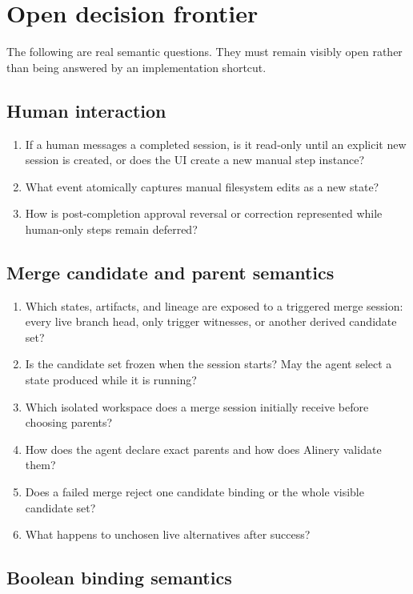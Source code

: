 \documentclass[11pt]{article}
\begin{document}
\section{Open decision frontier}

The following are real semantic questions. They must remain visibly open rather than being answered by an implementation shortcut.

\subsection{Human interaction}

\begin{enumerate}
  \item If a human messages a completed session, is it read-only until an explicit new session is created, or does the UI create a new manual step instance?
  \item What event atomically captures manual filesystem edits as a new state?
  \item How is post-completion approval reversal or correction represented while human-only steps remain deferred?
\end{enumerate}

\subsection{Merge candidate and parent semantics}

\begin{enumerate}
  \item Which states, artifacts, and lineage are exposed to a triggered merge session: every live branch head, only trigger witnesses, or another derived candidate set?
  \item Is the candidate set frozen when the session starts? May the agent select a state produced while it is running?
  \item Which isolated workspace does a merge session initially receive before choosing parents?
  \item How does the agent declare exact parents and how does Alinery validate them?
  \item Does a failed merge reject one candidate binding or the whole visible candidate set?
  \item What happens to unchosen live alternatives after success?
\end{enumerate}

\subsection{Boolean binding semantics}
\end{document}
